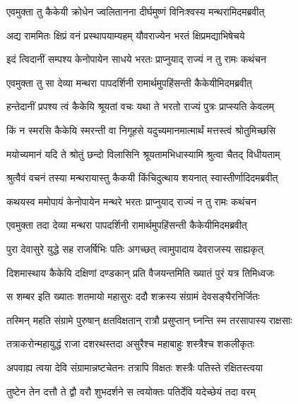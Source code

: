 
\twolineshloka
{एवमुक्ता तु कैकेयी क्रोधेन ज्वलितानना}
{दीर्घमुष्णं विनिःश्वस्य मन्थरामिदमब्रवीत्} %

\twolineshloka
{अद्य राममितः क्षिप्रं वनं प्रस्थापयाम्यहम्}
{यौवराज्येन भरतं क्षिप्रमद्याभिषेचये} %

\twolineshloka
{इदं त्विदानीं सम्पश्य केनोपायेन साधये}
{भरतः प्राप्नुयाद् राज्यं न तु रामः कथंचन} %

\twolineshloka
{एवमुक्ता तु सा देव्या मन्थरा पापदर्शिनी}
{रामार्थमुपहिंसन्ती कैकेयीमिदमब्रवीत्} %

\twolineshloka
{हन्तेदानीं प्रपश्य त्वं कैकेयि श्रूयतां वचः}
{यथा ते भरतो राज्यं पुत्रः प्राप्स्यति केवलम्} %

\twolineshloka
{किं न स्मरसि कैकेयि स्मरन्ती वा निगूहसे}
{यदुच्यमानमात्मार्थं मत्तस्त्वं श्रोतुमिच्छसि} %

\twolineshloka
{मयोच्यमानं यदि ते श्रोतुं छन्दो विलासिनि}
{श्रूयतामभिधास्यामि श्रुत्वा चैतद् विधीयताम्} %

\twolineshloka
{श्रुत्वैवं वचनं तस्या मन्थरायास्तु कैकयी}
{किंचिदुत्थाय शयनात् स्वास्तीर्णादिदमब्रवीत्} %

\twolineshloka
{कथयस्व ममोपायं केनोपायेन मन्थरे}
{भरतः प्राप्नुयाद् राज्यं न तु रामः कथंचन} %

\twolineshloka
{एवमुक्ता तदा देव्या मन्थरा पापदर्शिनी}
{रामार्थमुपहिंसन्ती कैकेयीमिदमब्रवीत्} %

\twolineshloka
{पुरा देवासुरे युद्धे सह राजर्षिभिः पतिः}
{अगच्छत् त्वामुपादाय देवराजस्य साह्यकृत्} %

\twolineshloka
{दिशमास्थाय कैकेयि दक्षिणां दण्डकान् प्रति}
{वैजयन्तमिति ख्यातं पुरं यत्र तिमिध्वजः} %

\twolineshloka
{स शम्बर इति ख्यातः शतमायो महासुरः}
{ददौ शक्रस्य संग्रामं देवसङ्घैरनिर्जितः} %

\twolineshloka
{तस्मिन् महति संग्रामे पुरुषान् क्षतविक्षतान्}
{रात्रौ प्रसुप्तान् घ्नन्ति स्म तरसापास्य राक्षसाः} %

\twolineshloka
{तत्राकरोन्महायुद्धं राजा दशरथस्तदा}
{असुरैश्च महाबाहुः शस्त्रैश्च शकलीकृतः} %

\twolineshloka
{अपवाह्य त्वया देवि संग्रामान्नष्टचेतनः}
{तत्रापि विक्षतः शस्त्रैः पतिस्ते रक्षितस्त्वया} %

\twolineshloka
{तुष्टेन तेन दत्तौ ते द्वौ वरौ शुभदर्शने}
{स त्वयोक्तः पतिर्देवि यदेच्छेयं तदा वरम्} %

